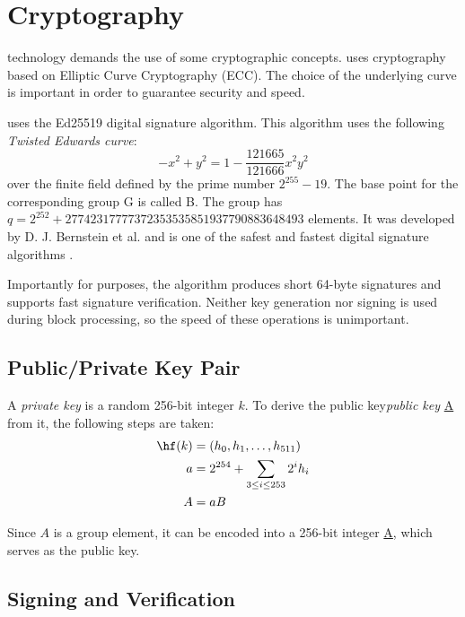 \section{Cryptography}
\label{sec:cryptography}


 technology demands the use of some cryptographic concepts.
\codenamespace uses cryptography based on Elliptic Curve Cryptography (ECC).
The choice of the underlying curve is important in order to guarantee security and speed.

\codenamespace uses the Ed25519 digital signature algorithm.
This algorithm uses the following \emph{Twisted Edwards curve}:
$$ -x^2 + y^2 = 1 - \frac{121665}{121666} x^2 y^2$$
over the finite field defined by the prime number $2^{255}-19$.
The base point for the corresponding group G is called B.
The group has $q=2^{252} + 27742317777372353535851937790883648493$ elements.
It was developed by D. J. Bernstein et al. and is one of the safest and fastest digital signature algorithms \cite{Bernstein2011}.

Importantly for \codenamespace purposes, the algorithm produces short 64-byte signatures and supports fast signature verification.
Neither key generation nor signing is used during block processing, so the speed of these operations is unimportant.

\subsection{Public/Private Key Pair}

A \emph{private key} is a random 256-bit integer $k$. To derive the public key\emph{public key} \underline{A} from it, the following steps are taken:
\begin{align}
	\hf(k) &=(h_0, h_1, \ldots, h_{511}) \\
	a &= 2^{254} + \sum_{3\leq i \leq 253} 2^i h_i \\
	A &= aB
\end{align}

Since $A$ is a group element, it can be encoded into a 256-bit integer \underline{A}, which serves as the public key.

\subsection{Signing and Verification}

